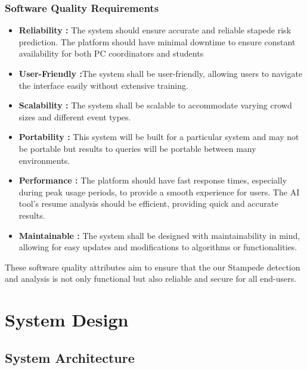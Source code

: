 \documentclass[11pt]{report}
\begin{document}
\subsection{Software Quality Requirements}
    \begin{itemize}
        \item \textbf{Reliability : }The system should ensure accurate and reliable stapede risk prediction. The platform should have minimal downtime to ensure constant availability for both PC coordinators and students
        \item \textbf{User-Friendly :}The system shall be user-friendly, allowing users to navigate the interface easily without extensive training.
        \item \textbf{Scalability : }The system shall be scalable to accommodate varying crowd sizes and different event types.
        \item \textbf{Portability :} This system will be built for a particular system and may not be portable but results to queries will be portable between many environments.
        \item \textbf{Performance : }The platform should have fast response times, especially during peak usage periods, to provide a smooth experience for users. The AI tool's resume analysis should be efficient, providing quick and accurate results.    
        \item \textbf{Maintainable : }The system shall be designed with maintainability in mind, allowing for easy updates and modifications to algorithms or functionalities.
    \end{itemize}
    
These software quality attributes aim to ensure that the our Stampede detection and analysis is not only functional but also reliable and secure for all end-users.

\chapter{System Design}
\section{System Architecture}
\end{document}
